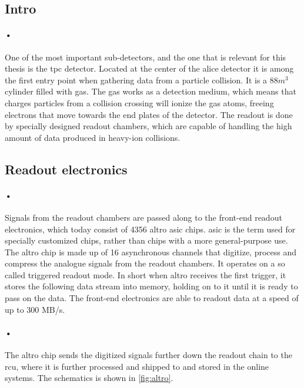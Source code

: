 \documentclass[a4paper]{report}
\begin{document}
\subsection{Intro}
\paragraph{•}
One of the most important sub-detectors, and the one that is relevant for this thesis is the \gls{tpc} detector.
Located at the center of the \gls{alice} detector it is among the first entry point when gathering data from a particle collision.
It is a 88\(m^3\) cylinder filled with gas.
The gas works as a detection medium, which means that charges particles from a collision crossing will ionize the gas atoms, freeing electrons that move towards the end plates of the detector.
The readout is done by specially designed readout chambers, which are capable of handling the high amount of data produced in heavy-ion collisions.

\subsection{Readout electronics} %
\paragraph{•}
Signals from the readout chambers are passed along to the front-end readout electronics, which today consist of 4356 \gls{altro} \gls{asic} chips.\cite{altro}
\gls{asic} is the term used for specially customized chips, rather than chips with a more general-purpose use.\cite{asic}
The \gls{altro} chip is made up of 16 asynchronous channels that digitize, process and compress the analogue signals from the readout chambers.
It operates on a so called triggered readout mode.
In short when \gls{altro} receives the first trigger, it stores the following data stream into memory, holding on to it until it is ready to pass on the data.
The front-end electronics are able to readout data at a speed of up to 300 MB/s.
\paragraph{•}
The \gls{altro} chip sends the digitized signals further down the readout chain to the \gls{rcu}, where it is further processed and shipped to  and stored in the online systems.
The schematics is shown in \ref{fig:altro}.
\end{document}
